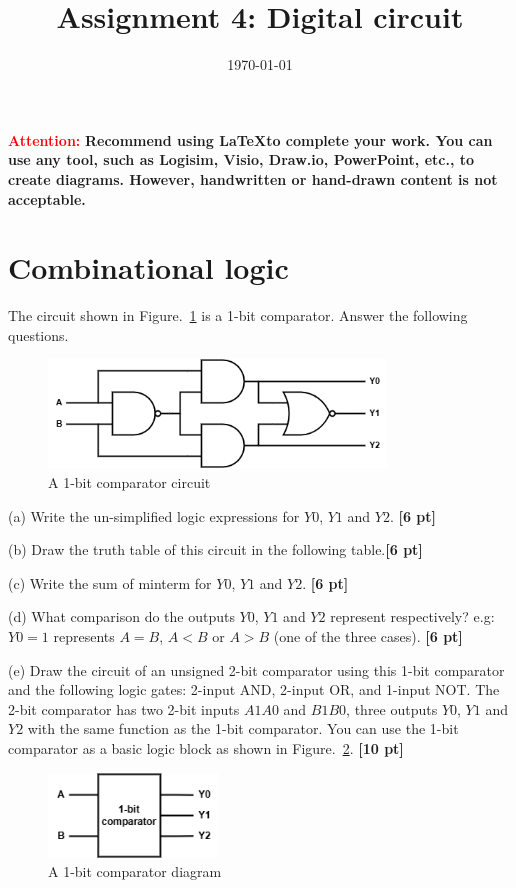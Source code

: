 \documentclass[a4paper]{article}
\date{\today}
\title{Assignment 4: Digital circuit}
\begin{document}
    \header{}
\textcolor{red}{\textbf{Attention: }}
\textbf{Recommend using \LaTeX \space to complete your work. You can use any tool, such as Logisim, Visio, Draw.io, PowerPoint, etc., to create diagrams. However, handwritten or hand-drawn content is not acceptable.}

\section{Combinational logic}
The circuit shown in Figure.~\ref{fig:Q1_circuit} is a 1-bit comparator. Answer the following questions. \\

\begin{figure}[htbp]
    \centering
    \includegraphics[width=0.8\textwidth]{Q1_circuit.png}
    \caption{A 1-bit comparator circuit}
    \label{fig:Q1_circuit}
\end{figure}

(a) Write the un-simplified logic expressions for $Y0$, $Y1$ and $Y2$. \textbf{[6 pt]}

(b) Draw the truth table of this circuit in the following table.\textbf{[6 pt]}

(c) Write the sum of minterm for $Y0$, $Y1$ and $Y2$. \textbf{[6 pt]}

(d) What comparison do the outputs $Y0$, $Y1$ and $Y2$ represent respectively? e.g: $Y0=1$ represents $A=B$, $A<B$ or $A>B$ (one of the three cases). \textbf{[6 pt]}

(e) Draw the circuit of an unsigned 2-bit comparator using this 1-bit comparator and the following logic gates: 2-input AND, 2-input OR, and 1-input NOT. The 2-bit comparator has two 2-bit inputs $A1A0$ and $B1B0$, three outputs $Y0$, $Y1$ and $Y2$ with the same function as the 1-bit comparator. You can use the 1-bit comparator as a basic logic block as shown in Figure.~\ref{fig:Q1_comparator_1}. \textbf{[10 pt]}

\begin{figure}[htbp]
    \centering
    \includegraphics[width=0.4\textwidth]{Q1_comparator_1.png}
    \caption{A 1-bit comparator diagram}
    \label{fig:Q1_comparator_1}
\end{figure}
\end{document}
